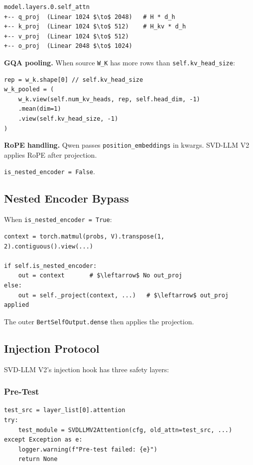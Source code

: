 \begin{lstlisting}
model.layers.0.self_attn
+-- q_proj  (Linear 1024 $\to$ 2048)   # H * d_h
+-- k_proj  (Linear 1024 $\to$ 512)    # H_kv * d_h
+-- v_proj  (Linear 1024 $\to$ 512)
+-- o_proj  (Linear 2048 $\to$ 1024)
\end{lstlisting}

\textbf{GQA pooling.} When source \texttt{W\_K} has more rows than \texttt{self.kv\_head\_size}:

\begin{lstlisting}
rep = w_k.shape[0] // self.kv_head_size
w_k_pooled = (
    w_k.view(self.num_kv_heads, rep, self.head_dim, -1)
    .mean(dim=1)
    .view(self.kv_head_size, -1)
)
\end{lstlisting}

\textbf{RoPE handling.} Qwen passes \texttt{position\_embeddings} in kwargs. SVD-LLM V2 
applies RoPE after projection.

\texttt{is\_nested\_encoder = False}.

\subsection{Nested Encoder Bypass}

When \texttt{is\_nested\_encoder = True}:

\begin{lstlisting}
context = torch.matmul(probs, V).transpose(1, 2).contiguous().view(...)

if self.is_nested_encoder:
    out = context       # $\leftarrow$ No out_proj
else:
    out = self._project(context, ...)   # $\leftarrow$ out_proj applied
\end{lstlisting}

The outer \texttt{BertSelfOutput.dense} then applies the projection.

\subsection{Injection Protocol}

SVD-LLM V2's injection hook has three safety layers:

\subsubsection{Pre-Test}

\begin{lstlisting}
test_src = layer_list[0].attention
try:
    test_module = SVDLLMV2Attention(cfg, old_attn=test_src, ...)
except Exception as e:
    logger.warning(f"Pre-test failed: {e}")
    return None
\end{lstlisting}

